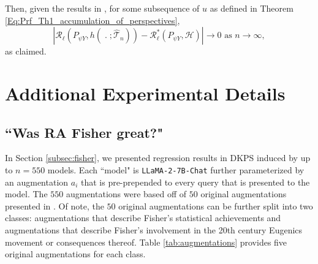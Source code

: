 \documentclass[11pt]{article}
\begin{document}
Then, given the results in \cite{sekhon2021result}, for some subsequence of $ u $ as defined in Theorem \ref{Eq:Prf_Th1_accumulation_of_perspectives}, 
\begin{equation*}
\left|
\mathcal{R}_{\ell}(P_{\psi Y},h(\;.\;;\widehat{\mathcal{T}}_n))-
\mathcal{R}^{*}_{\ell}(P_{\psi Y}, \mathcal{H})
\right|
\to 0 
\text{ as $n \to \infty$},
\end{equation*} as claimed.



\section{Additional Experimental Details}
\label{app:experiments}

\subsection{``Was RA Fisher great?"}
\label{app:fisher}
In Section \ref{subsec:fisher}, we presented regression results in DKPS induced by up to $ n = 550 $ models.
Each ``model" is \texttt{LLaMA-2-7B-Chat} further parameterized by an augmentation $ a_{i} $ that is pre-prepended to every query that is presented to the model.
The $ 550 $ augmentations were based off of $ 50 $ original augmentations presented in \cite{aranyak}.
Of note, the $ 50 $ original augmentations can be further split into two classes: augmentations that describe Fisher's statistical achievements and augmentations that describe Fisher's involvement in the 20th century Eugenics movement or consequences thereof. 
Table \ref{tab:augmentations} provides five original augmentations for each class.
\end{document}
